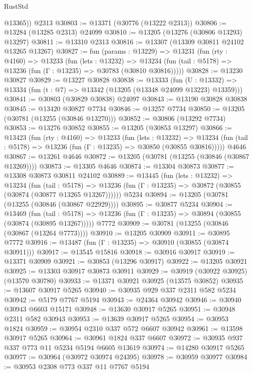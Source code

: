 \begin{lexlean}{RustStd}
\begin{coremodule}
        @13365))
    @2313
@30803 := @13371 (@30776 (@13222 @2313))
@30806 := @13284 (@13285 @2313) @24099
@30810 := @13205 (@13276 (@30806 @13293) @13297)
@30811 := @13310 @2313
@30816 := @13307 (@13309 @30811 @24102 @13265 @13267)
@30827 := fun (params : @13229) =>
  @13231
    (fun (rty : @4160) =>
    @13233
      (fun (lets : @13232) =>
      @13234 (fun (tail : @5178) => @13236 (fun (Γ : @13235) => @30783 (@30810 @30816)))))
@30828 := @13230 @30827
@30829 := @13227 @30828
@30838 := @13333
    (fun (U : @13332) => @13334 (fun (t : @7) => @13342 (@13205 (@13348 @24099 @13223) @13359)))
@30841 := @30803 (@30829 @30838) @24097
@30843 := @13190 @30828 @30838
@30845 := @13420 @30827 @7734
@30846 := @13257 @7734
@30850 := @13205 (@30781 (@13255 (@30846 @13270)))
@30852 := @30806 (@13292 @7734)
@30853 := @13276 @30852
@30855 := @13205 (@30853 @13297)
@30866 := @13423
    (fun (rty : @4160) =>
    @13233
      (fun (lets : @13232) =>
      @13234 (fun (tail : @5178) => @13236 (fun (Γ : @13235) => @30850 (@30855 @30816)))))
    @4646
@30867 := @13261 @4646
@30872 := @13205 (@30781 (@13255 (@30846 (@30867 @13269))))
@30873 := @13305 @4646
@30874 := @13304 @30873
@30877 := @13308 @30873 @30811 @24102
@30889 := @13445
    (fun (lets : @13232) =>
    @13234
      (fun (tail : @5178) =>
      @13236 (fun (Γ : @13235) => @30872 (@30855 (@30874 (@30877 @13265 @13267))))))
    @5234
@30894 := @13205 (@30781 (@13255 (@30846 (@30867 @22929))))
@30895 := @30877 @5234
@30904 := @13469
    (fun (tail : @5178) => @13236 (fun (Γ : @13235) => @30894 (@30855 (@30874 (@30895 @13267)))))
    @7772
@30909 := @30781 (@13255 (@30846 (@30867 (@13264 @7773))))
@30910 := @13205 @30909
@30911 := @30895 @7772
@30916 := @13487 (fun (Γ : @13235) => @30910 (@30855 (@30874 @30911)))
@30917 := @13545 @15816
@30918 := @30916 @30917
@30919 := @13371 @30909
@30921 := @30853 (@13296 @30917)
@30922 := @13205 @30921
@30925 := @13303 @30917 @30873 @30911
@30929 := @30919 (@30922 @30925) (@13570 @30780)
@30933 := @13371 @30921 @30925 (@13575 @30852)
@30935 := @13607 @30917 @5265
@30940 := @30935 @929 @337 @2311 @582 @5234
@30942 := @5179 @7767 @5194
@30943 := @24364 @30942
@30946 := @30940 @30943 @6603 @15171
@30948 := @13630 @30917 @5265
@30951 := @30948 @2311 @582 @30943
@30953 := @13639 @30917 @5265
@30954 := @30953 @1824
@30959 := @30954 @2310 @337 @572 @6607 @30942
@30961 := @13598 @30917 @5265
@30964 := @30961 @1824 @337 @6607
@30972 := @30935 @937 @337 @773 @11 @5234 @5194 @6605 @13619
@30974 := @14280 @30917 @5265
@30977 := @30964 (@30972 @30974 @24395)
@30978 := @30959 @30977
@30984 := @30953 @2308 @773 @337 @11 @7767 @5194

\end{coremodule}
\end{lexlean}
